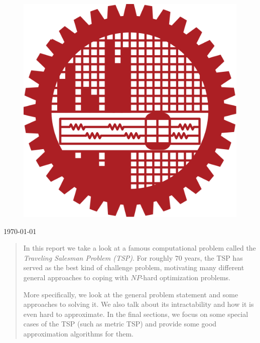 \documentclass[12pt]{article}
\begin{document}
\begin{titlepage}
\vfill
\begin{figure}[!h]
    \centering
    \includegraphics[scale=.07]{figures/buet.png}
\end{figure}

\vspace{1mm}

{\large \today} 
 

\vfill %

\end{titlepage}


\begin{abstract}

In this report we take a look at a famous computational problem called the \textit{Traveling Salesman Problem (TSP)}. For roughly \(70\) years, the TSP has served as the best kind of challenge problem, motivating many different general approaches to coping with \(NP\)-hard optimization problems. 

\vspace{2mm}

More specifically, we look at the general problem statement and some approaches to solving it. We also talk about its intractability and how it is even hard to approximate. In the final sections, we focus on some special cases of the TSP (such as metric TSP) and provide some good approximation algorithms for them.

\end{abstract}
\end{document}

